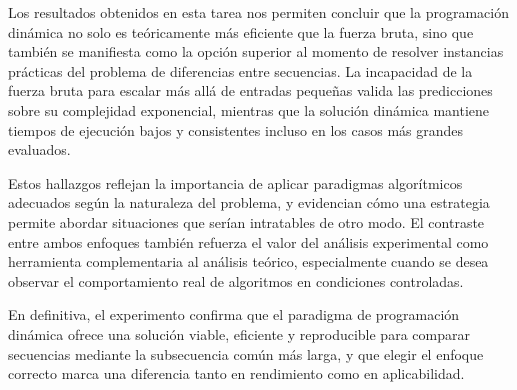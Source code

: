 Los resultados obtenidos en esta tarea nos permiten concluir que la programación dinámica no solo es teóricamente más eficiente que la fuerza bruta, sino que también se manifiesta como la opción superior al momento de resolver instancias prácticas del problema de diferencias entre secuencias. La incapacidad de la fuerza bruta para escalar más allá de entradas pequeñas valida las predicciones sobre su complejidad exponencial, mientras que la solución dinámica mantiene tiempos de ejecución bajos y consistentes incluso en los casos más grandes evaluados.

Estos hallazgos reflejan la importancia de aplicar paradigmas algorítmicos adecuados según la naturaleza del problema, y evidencian cómo una estrategia permite abordar situaciones que serían intratables de otro modo. El contraste entre ambos enfoques también refuerza el valor del análisis experimental como herramienta complementaria al análisis teórico, especialmente cuando se desea observar el comportamiento real de algoritmos en condiciones controladas.

En definitiva, el experimento confirma que el paradigma de programación dinámica ofrece una solución viable, eficiente y reproducible para comparar secuencias mediante la subsecuencia común más larga, y que elegir el enfoque correcto marca una diferencia tanto en rendimiento como en aplicabilidad.
